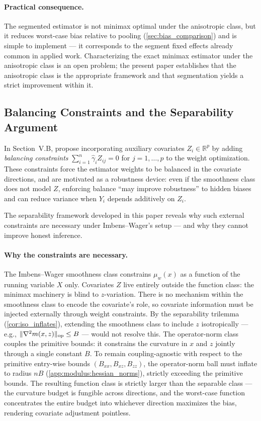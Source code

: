 \paragraph{Practical consequence.}
The segmented estimator is not minimax optimal under the anisotropic class, but it reduces worst-case bias relative to pooling (\cref{sec:bias_comparison}) and is simple to implement --- it corresponds to the segment fixed effects already common in applied work.
Characterizing the exact minimax estimator under the anisotropic class is an open problem; the present paper establishes that the anisotropic class is the appropriate framework and that segmentation yields a strict improvement within it.


\subsection*{Balancing Constraints and the Separability Argument}

In Section~V.B, \textcite{imbens_optimized_2019} propose incorporating auxiliary covariates $Z_i \in \mathbb{R}^p$ by adding \emph{balancing constraints} $\sum_{i=1}^n \hat\gamma_i Z_{ij} = 0$ for $j = 1, \ldots, p$ to the weight optimization.
These constraints force the estimator weights to be balanced in the covariate directions, and are motivated as a robustness device: even if the smoothness class does not model $Z$, enforcing balance ``may improve robustness'' to hidden biases and can reduce variance when $Y_i$ depends additively on $Z_i$.

The separability framework developed in this paper reveals why such external constraints are necessary under Imbens--Wager's setup --- and why they cannot improve honest inference.

\paragraph{Why the constraints are necessary.}
The Imbens--Wager smoothness class constrains $\mu_w(x)$ as a function of the running variable $X$ only.
Covariates $Z$ live entirely outside the function class: the minimax machinery is blind to $z$-variation.
There is no mechanism within the smoothness class to encode the covariate's role, so covariate information must be injected externally through weight constraints.
By the separability trilemma (\cref{cor:iso_inflates}), extending the smoothness class to include $z$ isotropically --- e.g., $\lVert\nabla^2 m(x,z)\rVert_{\mathrm{op}} \leq B$ --- would not resolve this.
The operator-norm class couples the primitive bounds: it constrains the curvature in $x$ and $z$ jointly through a single constant $B$.
To remain coupling-agnostic with respect to the primitive entry-wise bounds $(B_{xx}, B_{xz}, B_{zz})$, the operator-norm ball must inflate to radius $nB$ (\cref{app:modulus:hessian_norms}), strictly exceeding the primitive bounds.
The resulting function class is strictly larger than the separable class --- the curvature budget is fungible across directions, and the worst-case function concentrates the entire budget into whichever direction maximizes the bias, rendering covariate adjustment pointless.

